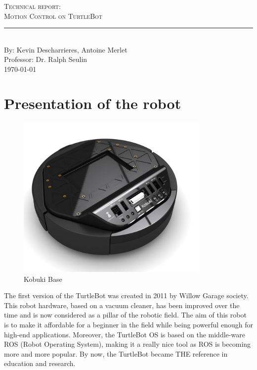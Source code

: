 \documentclass[aps,letterpaper,11pt]{revtex4}
\newcommand{\labno}{Technical report}
\newcommand{\labtitle}{Motion Control on TurtleBot}
\newcommand{\authorname}{Kevin Descharrieres, Antoine Merlet}
\newcommand{\professor}{Dr. Ralph Seulin}
\begin{document}
  
\begin{titlepage}
\begin{center}
{\LARGE \textsc{\labno:} \\ \vspace{4pt}}
{\Large \textsc{\labtitle} \\ \vspace{4pt}} 
\rule[13pt]{\textwidth}{1pt} \\ \vspace{150pt}
{\large By: \authorname \\ \vspace{10pt}
Professor: \professor \\ \vspace{10pt}
\today}
\end{center}




\end{titlepage}%
\newpage
\tableofcontents
\newpage

\section{Presentation of the robot}

\begin{figure}[H]
	\centering
	\includegraphics[height=8cm]{Mobile-Robot-Kobuki.jpg}
	\caption{Kobuki Base}
	\label{fig:Robot Base}    
\end{figure}

The first version of the TurtleBot was created in 2011 by Willow Garage society. This robot hardware, based on a vacuum cleaner, has been improved over the time and is now considered as a pillar of the robotic field. The aim of this robot is to make it affordable for a beginner in the field while being powerful enough for high-end applications. Moreover, the TurtleBot OS is based on the middle-ware ROS (Robot Operating System), making it a really nice tool as ROS is becoming more and more popular. By now, the TurtleBot became THE reference in education and research.
\end{document}
